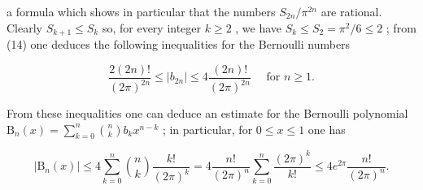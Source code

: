 a formula which shows in particular that the numbers \(S_{2n} / \pi^{2n}\) are rational. Clearly \(S_{k + 1} \leqslant S_k\) so, for every integer \(k \geqslant 2\) , we have \(S_k \leqslant S_2 = \pi^2 / 6 \leqslant 2\) ; from (14) one deduces the following inequalities for the Bernoulli numbers

\[
\frac {2 (2 n) !}{(2 \pi) ^ {2 n}} \leqslant | b _ {2 n} | \leqslant 4 \frac {(2 n) !}{(2 \pi) ^ {2 n}} \quad \text {   for   } n \geqslant 1.\tag{15}
\]

From these inequalities one can deduce an estimate for the Bernoulli polynomial \(\mathrm{B}_n(x) = \sum_{k=0}^{n}\binom{n}{k}b_kx^{n - k}\) ; in particular, for \(0 \leqslant x \leqslant 1\) one has

\[
\left| \mathrm{B} _ {n} (x) \right| \leqslant 4 \sum_ {k = 0} ^ {n} \binom {n} {k} \frac {k !}{(2 \pi) ^ {k}} = 4 \frac {n !}{(2 \pi) ^ {n}} \sum_ {k = 0} ^ {n} \frac {(2 \pi) ^ {k}}{k !} \leqslant 4 e ^ {2 \pi} \frac {n !}{(2 \pi) ^ {n}}.\tag{16}
\]

